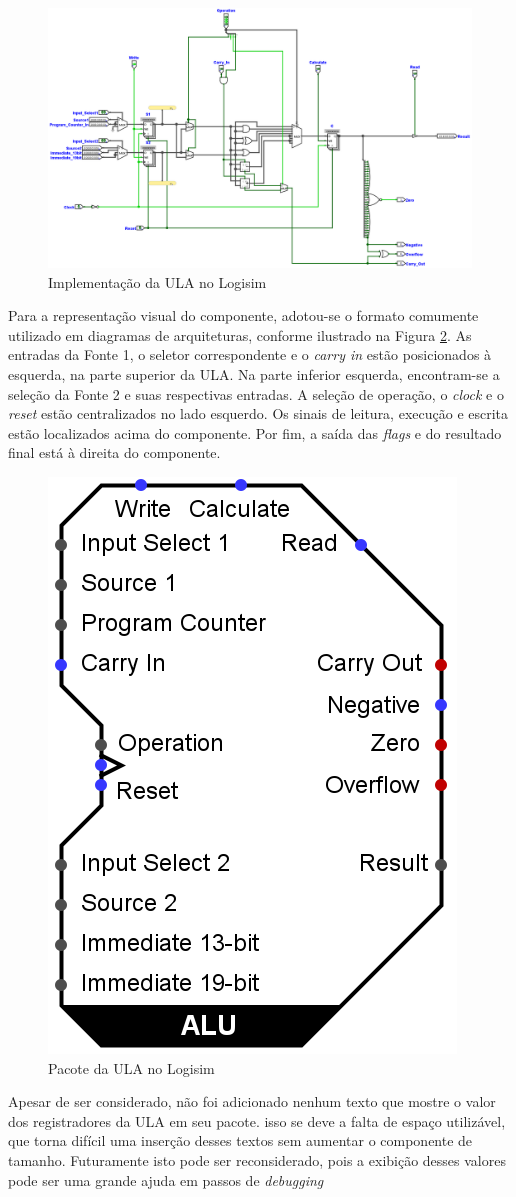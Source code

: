 \documentclass[
	article,			%
	11pt,				%
	oneside,			%
	a4paper,			%
	english,			%
	brazil,				%
	sumario=tradicional
	]{abntex2}
\begin{document}
\begin{figure}[H]
    \centering
    \includegraphics[width=0.75\linewidth]{Logisim/alu.png}
    \caption{Implementação da ULA no Logisim}
    \label{fig:aluLogisim}
\end{figure}
Para a representação visual do componente, adotou-se o formato comumente utilizado em diagramas de arquiteturas, conforme ilustrado na Figura \ref{fig:aluPack}. As entradas da Fonte 1, o seletor correspondente e o \textit{carry in} estão posicionados à esquerda, na parte superior da ULA. Na parte inferior esquerda, encontram-se a seleção da Fonte 2 e suas respectivas entradas. A seleção de operação, o \textit{clock} e o \textit{reset} estão centralizados no lado esquerdo. Os sinais de leitura, execução e escrita estão localizados acima do componente. Por fim, a saída das \textit{flags} e do resultado final está à direita do componente. 

\begin{figure}[H]
    \centering
    \includegraphics[width=0.25\linewidth]{Logisim/aluPack.png}
    \caption{Pacote da ULA no Logisim}
    \label{fig:aluPack}
\end{figure}
Apesar de ser considerado, não foi adicionado nenhum texto que mostre o valor dos registradores da ULA em seu pacote. isso se deve a falta de espaço utilizável, que torna difícil uma inserção desses textos sem aumentar o componente de tamanho. Futuramente isto pode ser reconsiderado, pois a exibição desses valores pode ser uma grande ajuda em passos de \textit{debugging}
\end{document}
